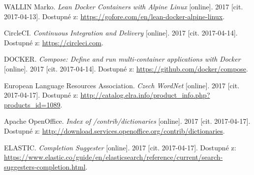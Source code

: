 \documentclass[FM,DP]{tulthesis}
\begin{document}
\begin{thebibliography}{Mm99}
 WALLIN Marko. \emph{Lean Docker Containers with Alpine Linux} [online].
2017 [cit. 2017-04-13]. Dostupné z: \url{https://gofore.com/en/lean-docker-alpine-linux}.

 CircleCI. \emph{Continuous Integration and Delivery} [online].
2017 [cit. 2017-04-14]. Dostupné z: \url{https://circleci.com}.

 DOCKER. \emph{Compose: Define and run multi-container applications with Docker} [online].
2017 [cit. 2017-04-14]. Dostupné z: \url{https://github.com/docker/compose}.

 European Language Resources Association. \emph{Czech WordNet} [online].
2017 [cit. 2017-04-17]. Dostupné z: \url{http://catalog.elra.info/product_info.php?products_id=1089}.

 Apache OpenOffice. \emph{Index of /contrib/dictionaries} [online].
2017 [cit. 2017-04-17]. Dostupné z: \url{http://download.services.openoffice.org/contrib/dictionaries}.

 ELASTIC. \emph{Completion Suggester} [online].
2017 [cit. 2017-04-17]. Dostupné z: 
\url{https://www.elastic.co/guide/en/elasticsearch/reference/current/search-suggesters-completion.html}.



\end{thebibliography}


\end{document}
